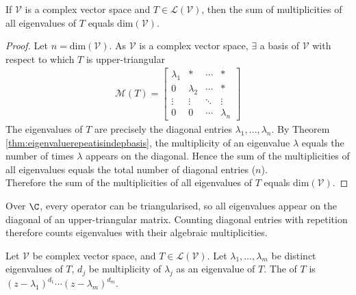 \begin{proposition} \label{prop:complexvectorspacesummultiplicities} If $\mathcal{V}$ is a complex vector space and $T \in \mathcal{L}(\mathcal{V})$, then the sum of multiplicities of all eigenvalues of $T$ equals $\text{dim}(\mathcal{V})$.
\begin{proof} Let $n = \text{dim}(\mathcal{V})$. As $\mathcal{V}$ is a complex vector space, $\exists$ a basis of $\mathcal{V}$ with respect to which $T$ is upper-triangular
\begin{align}
\mathcal{M}(T) =
\begin{bmatrix}
\lambda_1 & * & \cdots & * \\
0 & \lambda_2 & \cdots & * \\
\vdots & \vdots & \ddots & \vdots \\
0 & 0 & \cdots & \lambda_n
\end{bmatrix} \nonumber
\end{align}
The eigenvalues of $T$ are precisely the diagonal entries $\lambda_1, \ldots, \lambda_n$. By Theorem \ref{thm:eigenvaluerepeatisindepbasis}, the multiplicity of an eigenvalue $\lambda$ equals the number of times $\lambda$ appears on the diagonal. Hence the sum of the multiplicities of all eigenvalues equals the total number of diagonal entries ($n$).\\
Therefore the sum of the multiplicities of all eigenvalues of $T$ equals $\text{dim}(\mathcal{V})$.
\end{proof}	
\end{proposition}

Over $\C$, every operator can be triangularised, so all eigenvalues appear on the diagonal of an upper-triangular matrix. Counting diagonal entries with repetition therefore counts eigenvalues with their algebraic multiplicities.

\begin{definition} Let $\mathcal{V}$ be complex vector space, and $T \in \mathcal{L}(\mathcal{V})$. Let $\lambda_1, \ldots, \lambda_m$ be distinct eigenvalues of $T$, $d_j$ be multiplicity of $\lambda_j$ as an eigenvalue of $T$. The  of $T$ is $(z - \lambda_1)^{d_1} \cdots (z - \lambda_m)^{d_m}$.
\end{definition}

